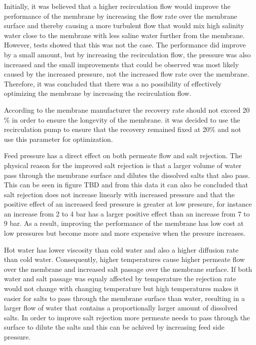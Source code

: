 Initially, it was believed that a higher recirculation flow would improve the performance of the membrane by increasing the flow rate over the membrane surface and thereby causing a more turbulent flow that would mix high salinity water close to the membrane with less saline water further from the membrane. However, tests showed that this was not the case. The performance did improve by a small amount, but by increasing the recirculation flow, the pressure was also increased and the small improvements that could be observed was most likely caused by the increased pressure, not the increased flow rate over the membrane. Therefore, it was concluded that there was a no possibility of effectively optimizing the membrane by increasing the recirculation flow. 

According to the membrane manufacturer the recovery rate should not exceed 20 \% in order to ensure the longevity of the membrane. it was decided to use the recirculation pump to ensure that the recovery remained fixed at 20\% and not use this parameter for optimization.

Feed pressure has a direct effect on both permeate flow and salt rejection. The physical reason for the improved salt rejection is that a larger volume of water pass through the membrane surface and dilutes the dissolved salts that also pass. This can be seen in figure TBD and from this data it can also be concluded that salt rejection does not increase linearly with increased pressure and that the positive effect of an increased feed pressure is greater at low pressure, for instance an increase from 2 to 4 bar has a larger positive effect than an increase from 7 to 9 bar. As a result, improving the performance of the membrane has low cost at low pressures but become more and more expensive when the presure increases.

Hot water has lower viscosity than cold water and also a higher diffusion rate than cold water. Consequently, higher temperatures cause higher permeate flow over the membrane and increased salt passage over the membrane surface. If both water and salt passage was equaly affected by temperature the rejection rate would not change with changing temperature but high temperatures makes it easier for salts to pass through the membrane surface than water, resulting in a larger flow of water that contains a proportionally larger amount of dissolved salts. In order to improve salt rejection more permeate needs to pass through the surface to dilute the salts and this can be achived by increasing feed side pressure. 

